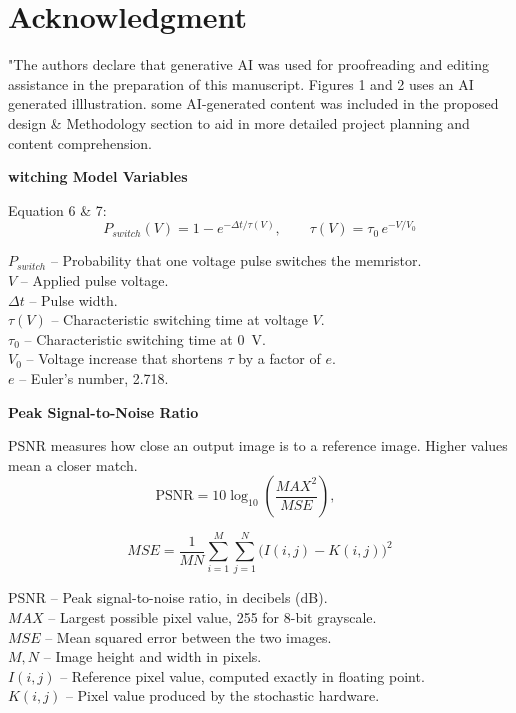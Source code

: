\documentclass[conference]{IEEEtran}
\begin{document}
\section*{Acknowledgment}
"The authors declare that generative AI was used for proofreading and editing 
assistance in the preparation of this manuscript. Figures 1 and  2 uses an AI generated
illlustration. some AI-generated content was included in the proposed design \& Methodology
section to aid in more detailed project planning and content comprehension.

\appendix
\textbf{witching Model Variables}
 
Equation 6 \& 7:
\[
  P_{switch}(V) = 1 - e^{-\Delta t/\tau(V)}, \qquad \tau(V) = \tau_0\, e^{-V/V_0}
\]
 
\noindent
$P_{switch}$ -- Probability that one voltage pulse switches the memristor.\\
$V$ -- Applied pulse voltage.\\
$\Delta t$ -- Pulse width.\\
$\tau(V)$ -- Characteristic switching time at voltage $V$.\\
$\tau_0$ -- Characteristic switching time at 0~V.\\
$V_0$ -- Voltage increase that shortens $\tau$ by a factor of $e$.\\
$e$ -- Euler's number, 2.718.

\textbf{Peak Signal-to-Noise Ratio}

PSNR measures how close an output image is to a reference image. Higher
values mean a closer match.
\[
  \mathrm{PSNR} = 10\log_{10}\!\left(\frac{MAX^2}{MSE}\right), \qquad
\]

\[
  MSE = \frac{1}{MN}\sum_{i=1}^{M}\sum_{j=1}^{N}\big(I(i,j) - K(i,j)\big)^2
\]

\noindent
$\mathrm{PSNR}$ -- Peak signal-to-noise ratio, in decibels (dB).\\
$MAX$ -- Largest possible pixel value, 255 for 8-bit grayscale.\\
$MSE$ -- Mean squared error between the two images.\\
$M, N$ -- Image height and width in pixels.\\
$I(i,j)$ -- Reference pixel value, computed exactly in floating point.\\
$K(i,j)$ -- Pixel value produced by the stochastic hardware.



\end{document}
